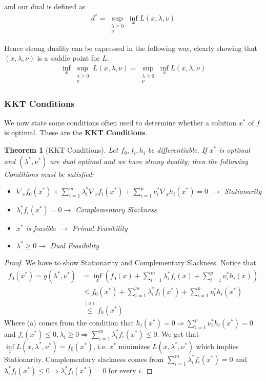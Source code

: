\documentclass[]{article}
\theoremstyle{mattstyle}
\newtheorem{theorem}{Theorem}[section]
\theoremstyle{definition}
\begin{document}
and our dual is defined as
\begin{align*}
d^* = \sup_{\substack{\lambda\ge0 \\ \nu}}\inf_x L(x, \lambda, \nu)
\end{align*}

Hence strong duality can be expressed in the following way, clearly showing that $(x, \lambda, \nu)$ is a saddle point for $L$.
\begin{align*}
\inf_x\sup_{\substack{\lambda\ge0 \\ \nu}}L(x, \lambda, \nu) = \sup_{\substack{\lambda\ge0 \\ \nu}}\inf_x L(x, \lambda, \nu)
\end{align*}

\subsubsection{KKT Conditions}

We now state some conditions often used to determine whether a solution $x^*$ of $f$ is optimal. These are the \textbf{KKT Conditions}.

\begin{theorem}[KKT Conditions]
	Let $f_0, f_i, h_i$ be differentiable. If $x^*$ is optimal and $(\lambda^*, \nu^*)$ are dual optimal and we have strong duality; then the following Conditions must be satisfied:
	\begin{itemize}
		\item $\nabla_x f_0(x^*) + \sum_{i=1}^m \lambda_i^* \nabla_x f_i(x^*) + \sum_{i=1}^p \nu_i^* \nabla_x h_i(x^*) = 0$ $\rightarrow$ Stationarity
		\item $\lambda_i^* f_i(x^*)=0 \rightarrow$ Complementary Slackness
		\item $x^*$ is feasible $\rightarrow$ Primal Feasibility
		\item $\lambda^* \ge 0 \rightarrow$ Dual Feasibility
	\end{itemize}
\end{theorem}
\begin{proof}
	We have to show Stationarity and Complementary Slackness. Notice that
	\begin{align}
	f_{0}(x^*) = g(\lambda^*, \nu^*) &= \inf_x \left( f_0(x) + \sum_{i=1}^m \lambda_i^*f_i(x) + \sum_{i=1}^p \nu_i^* h_i(x) \right) \\
	&\le f_0(x^*) + \sum_{i=1}^m \lambda_i^*f_i(x^*) + \sum_{i=1}^p \nu_i^* h_i(x^*)\\
	&\overset{(a)}{\le} f_0(x^*)
	\end{align}
	Where (a) comes from the condition that $h_i(x^*) = 0 \Rightarrow \sum_{i=1}^p \nu_i^* h_i(x^*) = 0$ and $f_i(x^*) \le 0, \lambda_i \ge 0 \Rightarrow \sum_{i=1}^m \lambda_i^* f_i(x^*) \le 0$. We get that $\inf\limits_{x} L(x, \lambda^*, \nu^*) = f_0(x^*)$, i.e. $x^*$ minimizes $L(x, \lambda^*, \nu^*)$ which implies Stationarity. Complementary slackness comes from $\sum_{i=1}^m \lambda_i^* f_i(x^*) = 0$ and $\lambda_i^* f_i(x^*) \le 0 \Rightarrow \lambda_i^* f_i(x^*) = 0$ for every $i$.
\end{proof}
\end{document}
